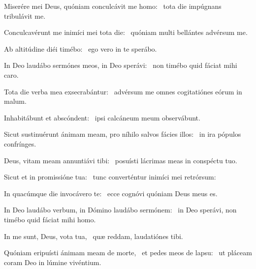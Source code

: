 \item Miserére mei Deus, quóniam conculcávit me homo:~\psstar{} tota die impúgnans tribulávit me.

\item Conculcavérunt me inimíci mei tota die:~\psstar{} quóniam multi bellántes advérsum me.

\item Ab altitúdine diéi timébo:~\psstar{} ego vero in te sperábo.

\item In Deo laudábo sermónes meos, in Deo sperávi:~\psstar{} non timébo quid fáciat mihi caro.

\item Tota die verba mea exsecrabántur:~\psstar{} advérsum me omnes cogitatiónes eórum in malum.

\item Inhabitábunt et abscón\-dent:~\psstar{} ipsi calcáneum meum observábunt.

\item Sicut sustinuérunt ánimam meam, pro níhilo salvos fácies illos:~\psstar{} in ira pópulos confrínges.

\item Deus, vitam meam annuntiávi tibi:~\psstar{} posuísti lácrimas meas in conspéctu tuo.

\item Sicut et in promissióne tua:~\psstar{} tunc converténtur inimíci mei retrórsum:

\item In quacúmque die invocávero te:~\psstar{} ecce cognóvi quóniam Deus meus es.

\item In Deo laudábo verbum, in Dómino laudábo sermónem:~\psstar{} in Deo sperávi, non timébo quid fáciat mihi homo.

\item In me sunt, Deus, vota tua,~\psstar{} quæ reddam, laudatiónes tibi.

\item Quóniam eripuísti ánimam meam de morte,~\pscross{} et pedes meos de lapsu:~\psstar{} ut pláceam coram Deo in lúmine vivéntium.
